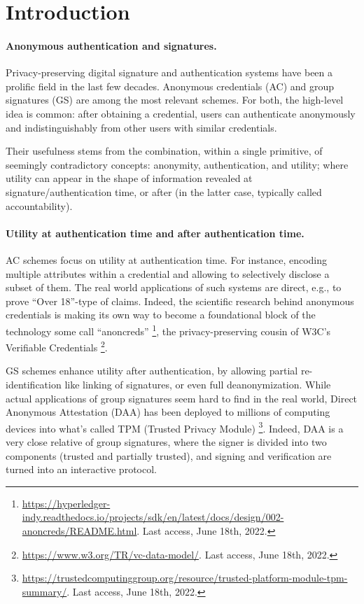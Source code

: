 \section{Introduction}
\label{sec:introduction}


\paragraph{Anonymous authentication and signatures.} %
Privacy-preserving digital signature and authentication systems have been a
prolific field in the last few decades. Anonymous credentials (AC)
\cite{chau85} and group signatures (GS) \cite{ch91} are among the most relevant
schemes. For both, the high-level idea is common: after obtaining a credential,
users can authenticate anonymously and indistinguishably from other users with
similar credentials. 

Their usefulness stems from the combination, within a single primitive, of
seemingly contradictory concepts: anonymity, authentication, and utility; where
utility can appear in the shape of information revealed at signature/authentication
time, or after (in the latter case, typically called accountability).

\paragraph{Utility at authentication time and after authentication time.} %
AC schemes focus on utility at authentication time. For instance, encoding
multiple attributes within a credential and allowing to selectively disclose a
subset of them. The real world applications of such systems are direct, e.g.,
to prove ``Over 18''-type of claims. Indeed, the scientific research behind
anonymous credentials is making its own way to become a foundational block of
the technology some call ``anoncreds''%
\footnote{\url{https://hyperledger-indy.readthedocs.io/projects/sdk/en/latest/docs/design/002-anoncreds/README.html}. Last access, June 18th, 2022.},
the privacy-preserving cousin of W3C's Verifiable Credentials%
\footnote{\url{https://www.w3.org/TR/vc-data-model/}. Last access, June 18th,
  2022.}.

GS schemes enhance utility after authentication, by allowing partial
re-identification like linking of signatures, or even full deanonymization.
While actual applications of group signatures seem hard to find in the real
world, Direct Anonymous Attestation (DAA) \cite{bcc04,bl07,cdl16b} has been
deployed to millions of computing devices into what's called TPM (Trusted
Privacy Module)%
\footnote{\url{https://trustedcomputinggroup.org/resource/trusted-platform-module-tpm-summary/}. Last access, June 18th, 2022.}.
Indeed, DAA is a very close relative of group signatures, where the signer is
divided into two components (trusted and partially trusted), and signing
and verification are turned into an interactive protocol.

